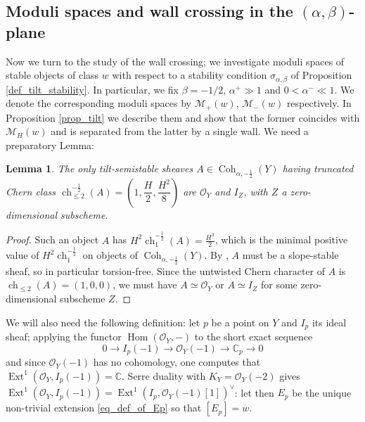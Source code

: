 \documentclass[11pt]{amsart}
\newtheorem{lemma}[thm]{Lemma}
\theoremstyle{definition}
\newcommand{\C}{\mathbb{C}}
\DeclareMathOperator{\Hom}{Hom}
\DeclareMathOperator{\Ext}{Ext}
\DeclareMathOperator{\Ch}{ch}
\DeclareMathOperator{\Coh}{Coh}
\newcommand{\sO}{\mathcal{O}}
\newcommand{\sM}{\mathcal{M}}
\begin{document}
\subsection{Moduli spaces and wall crossing in the $(\alpha,\beta)$-plane}\label{sec_tilt moduli}

Now we turn to the study of the wall crossing; we investigate moduli spaces of stable objects of class $w$ with respect to a stability condition $\sigma_{\alpha,\beta}$ of Proposition \ref{def_tilt_stability}. In particular, we fix $\beta=-1/2$, $\alpha^+ \gg 1$ and $0<\alpha^-\ll 1$. We denote the corresponding moduli spaces by $\sM_+(w)$, $\sM_-(w)$ respectively. In Proposition \ref{prop_tilt} we describe them and show that the former coincides with $\sM_H(w)$ and is separated from the latter by a single wall. We need a preparatory Lemma:

\begin{lemma}\label{possiblesubs}
The only tilt-semistable sheaves  $A\in \Coh_{\alpha,-\frac{1}{2}}(Y)$ having truncated Chern class 
$\Ch^{-\frac{1}{2}}_{\leq 2}(A)=\left(1,\dfrac{H}{2},\dfrac{H^2}{8}\right)$ 
are $\sO_Y$ and $I_Z$, with $Z$ a zero-dimensional subscheme.
\end{lemma}
\begin{proof}
Such an object $A$ has $H^2\Ch_1^{-\frac{1}{2}}(A)=\frac{H^3}{2}$, which is the minimal positive value of $H^2\Ch_1^{-\frac{1}{2}}$ on objects of $\Coh_{\alpha,-\frac{1}{2}}(Y)$. By \cite[Lemma 7.2.2]{BMT14}, $A$ must be a slope-stable sheaf, so in particular torsion-free. Since the untwisted Chern character of $A$ is 
$\Ch_{\leq 2}(A)=\left(1,0,0\right)$,
we must have $A\simeq \sO_Y$ or $A\simeq I_Z$ for some zero-dimensional subscheme $Z$.
\end{proof}

We will also need the following definition: let $p$ be a point on $Y$ and $I_p$ its ideal sheaf; applying the functor $\Hom(\sO_Y, -)$ to the short exact sequence
\[
0 \to I_p(-1)\to \sO_Y(-1) \to \C_p \to 0
\]
and since $\sO_Y(-1)$ has no cohomology, one computes that $\Ext^1(\sO_Y,I_p(-1))=\C$. Serre duality with $K_Y=\sO_Y(-2)$ gives $\Ext^1(\sO_Y,I_p(-1))=\Ext^1(I_p, \sO_Y(-1)[1])^\vee$: let then $E_p$ be the unique non-trivial extension \eqref{eq_def_of_Ep} so that $[E_p]=w$.
\end{document}
